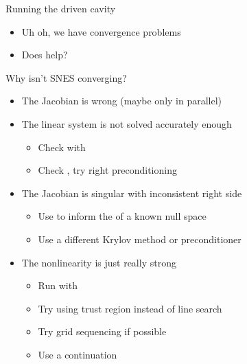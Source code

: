 \begin{frame}[fragile]{Running the driven cavity}
\begin{itemize}
{{  0 SNES Function norm 1.809960438828e+03 \\
  1 SNES Function norm 1.678372489097e+03 \\
  2 SNES Function norm 1.643759853387e+03 \\
  3 SNES Function norm 1.559341161485e+03 \\
  4 SNES Function norm 1.557604282019e+03 \\
  5 SNES Function norm 1.510711246849e+03 \\
  6 SNES Function norm 1.500472491343e+03 \\
  7 SNES Function norm 1.498930951680e+03 \\
  8 SNES Function norm 1.498440256659e+03 \\
  ...
}}
  \item<5-> Uh oh, we have convergence problems
  \item<5-> Does  help?
  \end{itemize}
\end{frame}

\begin{frame}{Why isn't SNES converging?}
  \begin{itemize}
  \item The Jacobian is wrong (maybe only in parallel)
  \item The linear system is not solved accurately enough
    \begin{itemize}
    \item Check with 
    \item Check , try right preconditioning
    \end{itemize}
  \item The Jacobian is singular with inconsistent right side
    \begin{itemize}
    \item Use  to inform the  of a known null space
    \item Use a different Krylov method or preconditioner
    \end{itemize}
  \item The nonlinearity is just really strong
    \begin{itemize}
    \item Run with 
    \item Try using trust region instead of line search 
    \item Try grid sequencing if possible
    \item Use a continuation
    \end{itemize}
  \end{itemize}
\end{frame}

